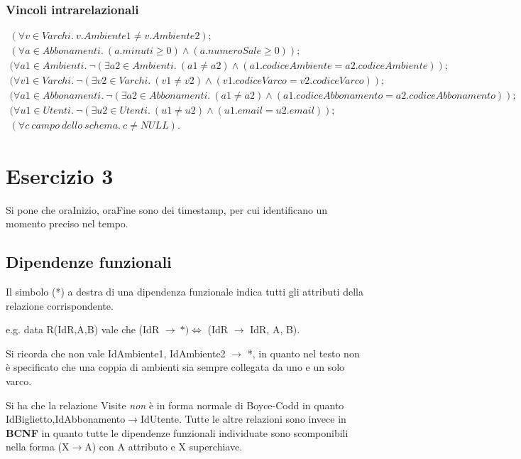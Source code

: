 \documentclass[10pt, italian, openany, landscape, fleqn]{book}
\newcommand*{\MyIncludeGraphics}[2][]{%
\begin{adjustbox}{max size={0.8\textwidth}{\textheight}}
    \texttt{[image: \#2]}%
\end{adjustbox}
}
\begin{document}
\subsubsection*{Vincoli intrarelazionali}
\begin{gather*}
(\forall v \in Varchi. \ v.Ambiente1 \neq v.Ambiente2); \\
(\forall a \in Abbonamenti.\ (a.minuti \geq 0) \wedge (a.numeroSale \geq 0)); \\
(\forall a1 \in Ambienti. \ \neg(\exists a2 \in Ambienti. \ (a1 \neq a2) \wedge (a1.codiceAmbiente = a2.codiceAmbiente)); \\
(\forall v1 \in Varchi. \ \neg(\exists v2 \in Varchi. \ (v1 \neq v2) \wedge (v1.codiceVarco = v2.codiceVarco)); \\
(\forall a1 \in Abbonamenti. \ \neg(\exists a2 \in Abbonamenti. \ (a1 \neq a2) \wedge (a1.codiceAbbonamento = a2.codiceAbbonamento)); \\
(\forall u1 \in Utenti. \ \neg(\exists u2 \in Utenti. \ (u1 \neq u2) \wedge (u1.email = u2.email)); \\
(\forall c \ campo \ dello \ schema. \ c \neq NULL ).
\end{gather*}
\pagebreak

\section{Esercizio 3}
Si pone che oraInizio, oraFine sono dei timestamp, per cui identificano un momento preciso nel tempo.
\pagebreak
\subsection*{Dipendenze funzionali}
Il simbolo (*) a destra di una dipendenza funzionale indica tutti gli attributi della relazione corrispondente.

e.g. data R(IdR,A,B) vale che (IdR \( \rightarrow  \ *) \Leftrightarrow \) (IdR \( \rightarrow \) IdR, A, B).

Si ricorda che non vale IdAmbiente1, IdAmbiente2 \( \rightarrow \) *, in quanto nel testo non \`e specificato che una coppia di ambienti sia 
sempre collegata da uno e un solo varco.

Si ha che la relazione Visite \textit{non} \`e in forma normale di Boyce-Codd in quanto IdBiglietto,IdAbbonamento\( \rightarrow \)IdUtente. Tutte le altre relazioni sono invece in \textbf{BCNF}
in quanto tutte le dipendenze funzionali individuate sono scomponibili nella forma (X\( \rightarrow \)A) con A attributo e X superchiave.
\end{document}
